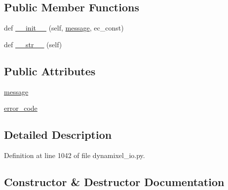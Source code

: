 \subsection*{Public Member Functions}
\begin{DoxyCompactItemize}
\item 
def \hyperlink{classdynamixel__driver_1_1dynamixel__io_1_1_error_code_error_a25d8e2b62ddf9d65ed7344ba103f394d}{\+\_\+\+\_\+init\+\_\+\+\_\+} (self, \hyperlink{classdynamixel__driver_1_1dynamixel__io_1_1_error_code_error_a1031c34e3bc89a21b256b110dade5cbe}{message}, ec\+\_\+const)
\item 
def \hyperlink{classdynamixel__driver_1_1dynamixel__io_1_1_error_code_error_a32541e7cf5167ab6872b98749262d1bd}{\+\_\+\+\_\+str\+\_\+\+\_\+} (self)
\end{DoxyCompactItemize}
\subsection*{Public Attributes}
\begin{DoxyCompactItemize}
\item 
\hyperlink{classdynamixel__driver_1_1dynamixel__io_1_1_error_code_error_a1031c34e3bc89a21b256b110dade5cbe}{message}
\item 
\hyperlink{classdynamixel__driver_1_1dynamixel__io_1_1_error_code_error_adcc9c0fc18f416577ac6bd63acd7640c}{error\+\_\+code}
\end{DoxyCompactItemize}


\subsection{Detailed Description}


Definition at line 1042 of file dynamixel\+\_\+io.\+py.



\subsection{Constructor \& Destructor Documentation}
\mbox{\label{classdynamixel__driver_1_1dynamixel__io_1_1_error_code_error_a25d8e2b62ddf9d65ed7344ba103f394d}} 
